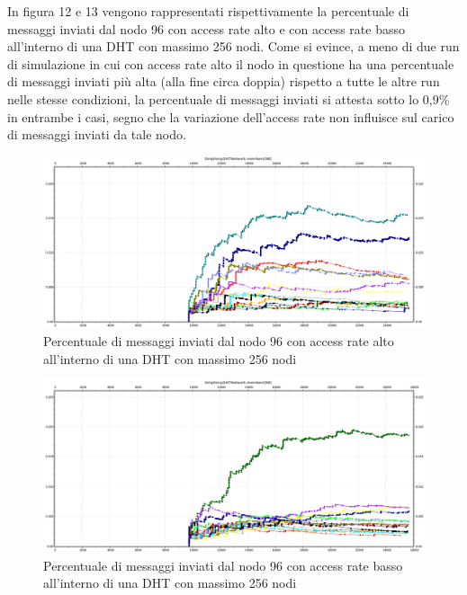 \documentclass[	
	DIV=calc,
	paper=a4,
	fontsize=11pt,
	onecolumn
]{scrartcl} %
\begin{document}
	In figura 12 e 13 vengono rappresentati rispettivamente la percentuale di messaggi inviati dal nodo 96 con access rate alto e con access rate basso all'interno di una DHT con massimo 256 nodi. Come si evince, a meno di due run di simulazione in cui con access rate alto il nodo in questione ha una percentuale di messaggi inviati più alta (alla fine circa doppia) rispetto a tutte le altre run nelle stesse condizioni, la percentuale di messaggi inviati si attesta sotto lo 0,9\% in entrambe i casi, segno che la variazione dell'access rate non influisce sul carico di messaggi inviati da tale nodo.
	
	\begin{figure}[H]
		\centering
		\includegraphics[scale=0.35]	{SymphonyDHT/plots/PercentageOfMessagesSent/256_Nodes_FastAccess/SymphonyDHT_256Nodes_FastAccess_Node96.png}
		\caption{Percentuale di messaggi inviati dal nodo 96 con access rate alto all'interno di una DHT con massimo 256 nodi}
		\label{Figura 12}
	\end{figure}
	\begin{figure}[H]
		\centering
		\includegraphics[scale=0.35]	{SymphonyDHT/plots/PercentageOfMessagesSent/256_Nodes_SlowAccess/SymphonyDHT_256Nodes_SlowAccess_Node96.png}
		\caption{Percentuale di messaggi inviati dal nodo 96 con access rate basso all'interno di una DHT con massimo 256 nodi}
		\label{Figura 13}
	\end{figure}	
	
\end{document}
